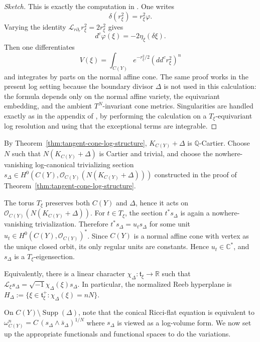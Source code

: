 \documentclass[11pt]{amsart}
\theoremstyle{definition}
\theoremstyle{remark}
\begin{document}
\begin{proof}[Sketch]
This is exactly the computation in \cite[Lemma 4.1]{DSII}. One writes
\[
        \delta(r_\xi^2)=r_\xi^2\varphi .
\]
Varying the identity $\mathcal L_{r\partial_r}r_\xi^2=2r_\xi^2$ gives
\[
        d^c\varphi(\xi)=-2\eta_\xi(\delta\xi).
\]
Then one differentiates
\[
        V(\xi)=\int_{C(Y)}
        e^{-r_\xi^2/2}(dd^c r_\xi^2)^n
\]
and integrates by parts on the normal affine cone. The same proof works in the
present log setting because the boundary divisor $\Delta$ is not used in this
calculation: the formula depends only on the normal affine variety, the
equivariant embedding, and the ambient $T^N$-invariant cone metrics. Singularities
are handled exactly as in the appendix of \cite{DSII}, by performing the
calculation on a $T_\xi$-equivariant log resolution and using that the exceptional
terms are integrable.
\end{proof}

By Theorem~\ref{thm:tangent-cone-log-structure},
$K_{C(Y)}+\Delta$ is $\mathbb Q$-Cartier. Choose $N$ such that $N(K_{C(Y)}+\Delta)$ is Cartier and trivial, and choose the
nowhere-vanishing log-canonical trivializing section
$s_\Delta\in H^0\left(C(Y), \mathcal O_{C(Y)}(N(K_{C(Y)}+\Delta))\right)$
constructed in the proof of Theorem~\ref{thm:tangent-cone-log-structure}.

The torus $T_\xi$ preserves both $C(Y)$ and $\Delta$, hence it acts on
$\mathcal O_{C(Y)}(N(K_{C(Y)}+\Delta))$. For $t\in T_\xi$, the section
$t^*s_\Delta$ is again a nowhere-vanishing trivialization. Therefore $t^*s_\Delta=u_t s_\Delta$ for some unit $u_t\in H^0(C(Y),\mathcal O_{C(Y)})^*$. Since $C(Y)$ is a normal
affine cone with vertex as the unique closed orbit, its only regular units are
constants. Hence $u_t\in\mathbb C^*$, and $s_\Delta$ is a $T_\xi$-eigensection.

Equivalently, there is a linear character $\chi_\Delta:\mathfrak t_\xi\rightarrow \mathbb R$  such that $\mathcal L_\xi s_\Delta=\sqrt{-1}\chi_\Delta(\xi)s_\Delta$.
In particular, the normalized Reeb hyperplane is $H_\Delta:=\{\xi\in\mathfrak t_\xi^+:\chi_\Delta(\xi)=nN\}.$


On $C(Y)\setminus\operatorname{Supp}(\Delta)$, note that the conical Ricci-flat equation is
equivalent to $ \omega_{C(Y)}^n = C\,(s_\Delta\wedge \bar s_\Delta)^{1/N}$
where $s_\Delta$ is viewed as a log-volume form. We now set up the appropriate functionals and functional spaces to do the variations. 
\end{document}
